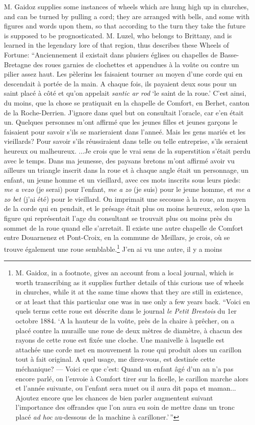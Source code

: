 \documentclass[a4paper, 11pt, oneside, polutonikogreek, english]{article}
\begin{document}
M. Gaidoz supplies some instances of wheels which are hung high up in churches, and can be turned by pulling a cord; they are arranged with bells, and some with figures and words upon them, so that according to the turn they take the future is supposed to be prognosticated. M. Luzel, who belongs to Brittany, and is learned in the legendary lore of that region, thus describes these Wheels of Fortune: ``Anciennement il existait dans plusiers églises ou chapelles de Basse-Bretagne des roues garnies de clochettes et appendues à la voûte ou contre un pilier assez haut. Les pèlerins les faisaient tourner au moyen d'une corde qui en descendait à portée de la main. A chaque fois, ils payaient deux sous pour un saint placé à côté et qu'on appelait \emph{santic ar rod} `le saint de la roue.' C'est ainsi, du moins, que la chose se pratiquait en la chapelle de Comfort, en Berhet, canton de la Roche-Derrien. J'ignore dans quel but on consultait l'oracle, car e'en était un. Quelques personnes m'ont affirmé que les jeunes filles et jeunes garçons le faisaient pour savoir s'ils se marieraient dans l'anneé. Mais les gens mariés et les vieillards? Pour savoir s'ils réussiraient dans telle ou telle entreprise, s'ils seraient heureux ou malheureux. ...Je crois que le vrai sens de la superstition s'était perdu avec le temps. Dans ma jeunesse, des paysans bretons m'ont affirmé avoir vu ailleurs un triangle inscrit dans la roue et à chaque angle était un personnage, un enfant, un jeune homme et un vieillard, avec ces mots inscrits sous leurs pieds: \emph{me a vezo} (je serai) pour l'enfant, \emph{me a zo} (je suis) pour le jeune homme, et \emph{me a zo bet} (j'ai été) pour le vieillard. On imprimait une secousse à la roue, au moyen de la corde qui en pendait, et le présage était plus ou moins heureux, selon que la figure qui représentait l'age du consultant se trouvait plus ou moins près du sommet de la roue quand elle s'arretait. Il existe une autre chapelle de Comfort entre Douarnenez et Pont-Croix, en la commune de Meillars, je crois, où se trouve également une roue semblable.\footnote{M. Gaidoz, in a footnote, gives an account from a local journal, which is worth transcribing as it supplies further details of this curious use of wheels in churches, while it at the same time shows that they are still in existence, or at least that this particular one was in use only a few years back. ``Voici en quels terms cette roue est déscrite dans le journal \emph{le Petit Brestois} du 1er octobre 1884. `A la hauteur de la voûte, près de la chaire à prêcher, on a placé contre la muraille une roue de deux mètres de diamètre, à chacun des rayons de cette roue est fixée une cloche. Une manivelle à laquelle est attachée une corde met en mouvement la roue qui produit alors un carillon tout à fait original. A quel usage, me direz-vous, est destinée cette méchanique? --- Voici ce que c'est: Quand un enfant âgé d'un an n'a pas encore parlé, on l'envoie à Comfort tirer sur la ficelle, le carillon marche alors et l'année suivante, ou l'enfant sera muet ou il aura dit papa et maman... Ajoutez encore que les chances de bien parler augmentent suivant l'importance des offrandes que l'on aura eu soin de mettre dans un tronc placé \emph{ad hoc} au-dessous de la machine à carilloner.'\,''} J'en ai vu une autre, il y a moins 
\end{document}
